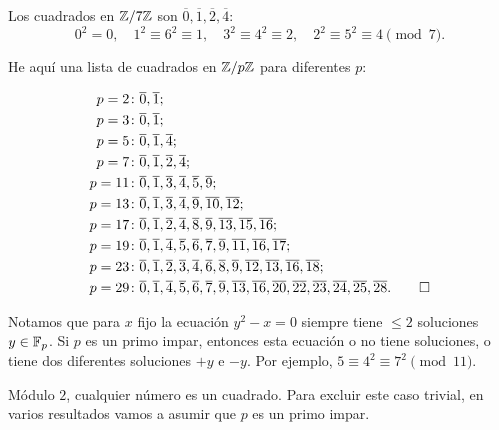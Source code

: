 \documentclass{article}
\theoremstyle{plain}
\begin{document}
\begin{ejemplo}
  Los cuadrados en $\mathbb{Z}/7\mathbb{Z}$ son
  $\overline{0}, \overline{1}, \overline{2}, \overline{4}$:
  $$0^2 = 0, \quad 1^2 \equiv 6^2 \equiv 1, \quad 3^2 \equiv 4^2 \equiv 2, \quad 2^2 \equiv 5^2 \equiv 4 \pmod{7}.$$

  He aquí una lista de cuadrados en $\mathbb{Z}/p\mathbb{Z}$ para diferentes $p$:

  \begin{align*}
    p=2\colon & \overline{0}, \overline{1};\\
    p=3\colon & \overline{0}, \overline{1};\\
    p=5\colon & \overline{0}, \overline{1}, \overline{4};\\
    p=7\colon & \overline{0}, \overline{1}, \overline{2}, \overline{4};\\
    p=11\colon & \overline{0}, \overline{1}, \overline{3}, \overline{4}, \overline{5}, \overline{9};\\
    p=13\colon & \overline{0}, \overline{1}, \overline{3}, \overline{4}, \overline{9}, \overline{10}, \overline{12};\\
    p=17\colon & \overline{0}, \overline{1}, \overline{2}, \overline{4}, \overline{8}, \overline{9}, \overline{13}, \overline{15}, \overline{16};\\
    p=19\colon & \overline{0}, \overline{1}, \overline{4}, \overline{5}, \overline{6}, \overline{7}, \overline{9}, \overline{11}, \overline{16}, \overline{17};\\
    p=23\colon & \overline{0}, \overline{1}, \overline{2}, \overline{3}, \overline{4}, \overline{6}, \overline{8}, \overline{9}, \overline{12}, \overline{13}, \overline{16}, \overline{18};\\
    p=29\colon & \overline{0}, \overline{1}, \overline{4}, \overline{5}, \overline{6}, \overline{7}, \overline{9}, \overline{13}, \overline{16}, \overline{20}, \overline{22}, \overline{23}, \overline{24}, \overline{25}, \overline{28}. \qedhere
  \end{align*}
\end{ejemplo}

Notamos que para $x$ fijo la ecuación $y^2 - x = 0$ siempre tiene $\le 2$
soluciones $y \in \mathbb{F}_p$. Si $p$ es un primo impar, entonces esta ecuación o no
tiene soluciones, o tiene dos diferentes soluciones $+y$ e $-y$. Por ejemplo,
$5 \equiv 4^2 \equiv 7^2 \pmod{11}$.

\begin{comentario}
  Módulo $2$, cualquier número es un cuadrado. Para excluir este caso trivial,
  en varios resultados vamos a asumir que $p$ es un primo impar.
\end{comentario}
\end{document}
